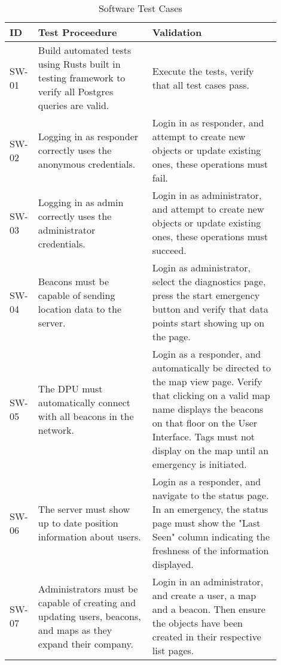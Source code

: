 \bigskip
\bgroup
\def\arraystretch{1.25}
\begin{table}[h!]
    \centering
    \begin{tabular}{|p{0.05\linewidth}|p{0.40\linewidth}|p{0.45\linewidth}|}
    \hline
    ID & Test Proceedure & Validation\\

    \hline
    SW-01
    & Build automated tests using Rusts built in testing framework to verify all Postgres queries are valid.
    & Execute the tests, verify that all test cases pass. \\

    \hline
    SW-02
    & Logging in as responder correctly uses the anonymous credentials.
    & Login in as responder, and attempt to create new objects or update existing ones, these operations must fail. \\

    \hline
    SW-03
    & Logging in as admin correctly uses the administrator credentials.
    & Login in as administrator, and attempt to create new objects or update existing ones, these operations must succeed. \\

    \hline
    SW-04
    & Beacons must be capable of sending location data to the server.
    & Login as administrator, select the diagnostics page, press the start emergency button and verify that data points start showing up on the page. \\

    \hline
    SW-05
    & The DPU must automatically connect with all beacons in the network.
    & Login as a responder, and automatically be directed to the map view page. Verify that clicking on a valid map name displays the beacons on that floor on the User Interface. Tags must not display on the map until an emergency is initiated. \\

    \hline
    SW-06
    & The server must show up to date position information about users.
    & Login as a responder, and navigate to the status page. In an emergency, the status page must show the "Last Seen" column indicating the freshness of the information displayed. \\

    \hline
    SW-07
    & Administrators must be capable of creating and updating users, beacons, and maps as they expand their company.
    & Login in an administrator, and create a user, a map and a beacon. Then ensure the objects have been created in their respective list pages. \\

    \hline
    \end{tabular}
    \caption{Software Test Cases}
\end{table}

